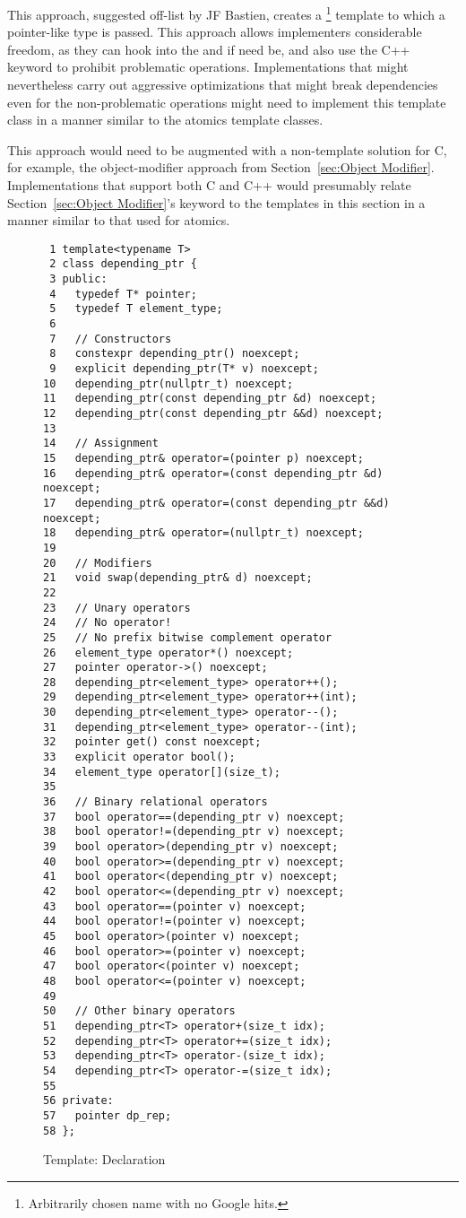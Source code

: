 This approach, suggested off-list by JF Bastien, creates a
\footnote{
	Arbitrarily chosen name with no Google hits.}
template to which a pointer-like type is passed.
This approach allows implementers considerable freedom, as they can
hook into the \co{->} and \co{*} if need be, and also use the C++
 keyword to prohibit problematic operations.
Implementations that might nevertheless carry out aggressive
optimizations that might break dependencies even for the non-problematic
operations might need to implement this template class in a manner
similar to the atomics template classes.

This approach would need to be augmented with a non-template solution
for C, for example, the object-modifier approach from
Section~\ref{sec:Object Modifier}.
Implementations that support both C and C++ would presumably relate
Section~\ref{sec:Object Modifier}'s
keyword to the templates in this section in a manner similar to
that used for atomics.

\begin{figure}[tbp]
{ \scriptsize
\begin{verbatim}
 1 template<typename T>
 2 class depending_ptr {
 3 public:
 4   typedef T* pointer;
 5   typedef T element_type;
 6
 7   // Constructors
 8   constexpr depending_ptr() noexcept;
 9   explicit depending_ptr(T* v) noexcept;
10   depending_ptr(nullptr_t) noexcept;
11   depending_ptr(const depending_ptr &d) noexcept;
12   depending_ptr(const depending_ptr &&d) noexcept;
13
14   // Assignment
15   depending_ptr& operator=(pointer p) noexcept;
16   depending_ptr& operator=(const depending_ptr &d) noexcept;
17   depending_ptr& operator=(const depending_ptr &&d) noexcept;
18   depending_ptr& operator=(nullptr_t) noexcept;
19
20   // Modifiers
21   void swap(depending_ptr& d) noexcept;
22
23   // Unary operators
24   // No operator!
25   // No prefix bitwise complement operator
26   element_type operator*() noexcept;
27   pointer operator->() noexcept;
28   depending_ptr<element_type> operator++();
29   depending_ptr<element_type> operator++(int);
30   depending_ptr<element_type> operator--();
31   depending_ptr<element_type> operator--(int);
32   pointer get() const noexcept;
33   explicit operator bool();
34   element_type operator[](size_t);
35
36   // Binary relational operators
37   bool operator==(depending_ptr v) noexcept;
38   bool operator!=(depending_ptr v) noexcept;
39   bool operator>(depending_ptr v) noexcept;
40   bool operator>=(depending_ptr v) noexcept;
41   bool operator<(depending_ptr v) noexcept;
42   bool operator<=(depending_ptr v) noexcept;
43   bool operator==(pointer v) noexcept;
44   bool operator!=(pointer v) noexcept;
45   bool operator>(pointer v) noexcept;
46   bool operator>=(pointer v) noexcept;
47   bool operator<(pointer v) noexcept;
48   bool operator<=(pointer v) noexcept;
49
50   // Other binary operators
51   depending_ptr<T> operator+(size_t idx);
52   depending_ptr<T> operator+=(size_t idx);
53   depending_ptr<T> operator-(size_t idx);
54   depending_ptr<T> operator-=(size_t idx);
55
56 private:
57   pointer dp_rep;
58 };
\end{verbatim}
}
\caption{Template: Declaration}
\label{fig:Template: Declaration}
\end{figure}

